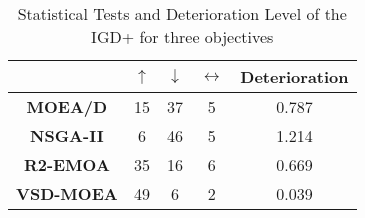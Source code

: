 \begin{table}[t]
\centering
\caption{Statistical Tests and Deterioration Level of the IGD+ for three objectives}
\label{tab:Tests_IGDP_3obj}
\begin{scriptsize}
\begin{tabular}{c c|c|c|c}
\cline{2-5}
                                        & \textbf{$\uparrow$} & \textbf{$\downarrow$} & \textbf{$\leftrightarrow$} & \textbf{Deterioration} \\ \hline
\multicolumn{1}{c|}{\textbf{MOEA/D}}   & 15                  & 37                    & 5                          & 0.787         \\ \hline
\multicolumn{1}{c|}{\textbf{NSGA-II}}  & 6                   & 46                    & 5                          & 1.214         \\ \hline
\multicolumn{1}{c|}{\textbf{R2-EMOA}}  & 35                  & 16                    & 6                          & 0.669         \\ \hline
\multicolumn{1}{c|}{\textbf{VSD-MOEA}} & 49                  & 6                     & 2                          & 0.039         \\ \hline
\end{tabular}%
\end{scriptsize}
\end{table}

